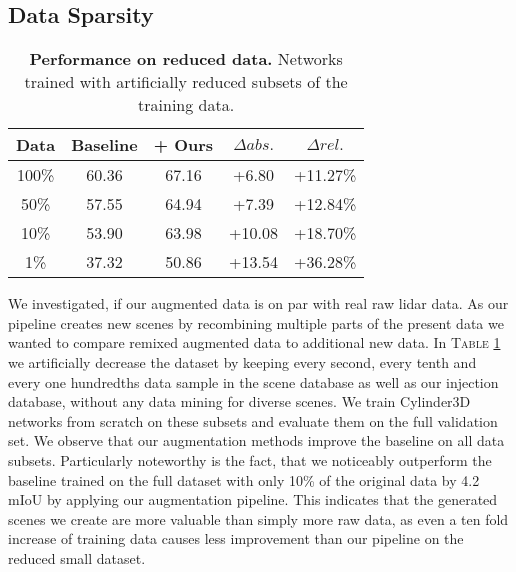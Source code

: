 \documentclass[letterpaper, 10 pt, conference]{ieeeconf}
\begin{document}
\subsection{Data Sparsity}
\begin{table}[!htbp]
	\caption{\textbf{Performance on reduced data.} Networks trained with artificially reduced subsets of the training data.}

	\begin{tabular}{ccccc}
		\hline
		Data  & Baseline & + Ours & $\Delta abs.$ & $\Delta rel.$ \\
		\hline
		
		100\% & 60.36 & 67.16 & +6.80 & +11.27\% \\
		
		50\% & 57.55 & 64.94 & +7.39 & +12.84\% \\
		
		10\% & 53.90 & 63.98 & +10.08 & +18.70\% \\
		
		1\% &  37.32 & 50.86 & +13.54 & +36.28\% \\
		\hline
	\end{tabular}
\label{tab:dataset-reduction}
	\centering
\end{table}


We investigated, if our augmented data is on par with real raw lidar data. As our pipeline creates new scenes by recombining multiple parts of the present data we wanted to compare remixed augmented data to additional new data. In \textsc{Table} \ref{tab:dataset-reduction} we artificially decrease the dataset by keeping every second, every tenth and every one hundredths data sample in the scene database as well as our injection database, without any data mining for diverse scenes. We train Cylinder3D \cite{zhou2020cylinder3d} networks from scratch on these subsets and evaluate them on the full validation set. We observe that our augmentation methods improve the baseline on all data subsets. Particularly noteworthy is the fact, that we noticeably outperform the baseline trained on the full dataset with only 10\% of the original data by 4.2 mIoU by applying our augmentation pipeline. This indicates that the generated scenes we create are more valuable than simply more raw data, as even a ten fold increase of training data causes less improvement than our pipeline on the reduced small dataset.
\end{document}
